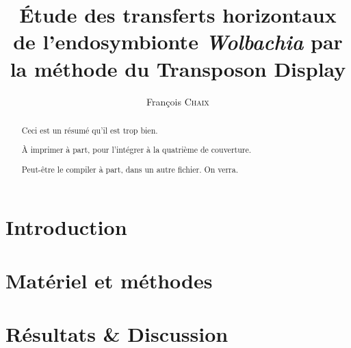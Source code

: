 \documentclass[a4paper, 12pt, linktocpage=true, oneside]{memoir}
\title{Étude des transferts horizontaux de l’endosymbionte \textit{Wolbachia} par la méthode du Transposon Display}
\author{François \textsc{Chaix}}
\renewcommand{\baselinestretch}{1.5}
\begin{document}
\maketitle
\tableofcontents

\chapter{Introduction}


\chapter{Matériel et méthodes}


\chapter{Résultats \& Discussion}


\printbibliography

\newpage
\pagestyle{empty}
\renewcommand{\baselinestretch}{1} %
\begin{abstract}
Ceci est un résumé qu'il est trop bien.

À imprimer à part, pour l'intégrer à la quatrième de couverture.

Peut-être le compiler à part, dans un autre fichier. On verra.
\end{abstract}
\end{document}
